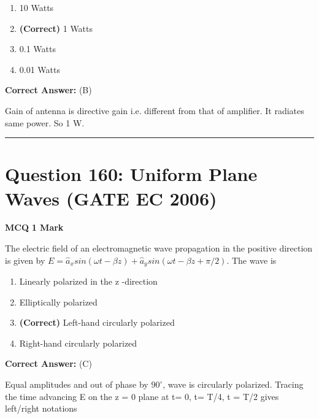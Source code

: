 \documentclass[11pt,a4paper]{article}
\begin{document}
\begin{enumerate}[label=(\Alph*)]
    \item 10 Watts
    \item \textbf{(Correct)} 1 Watts
    \item 0.1 Watts
    \item 0.01 Watts
\end{enumerate}

\noindent \textbf{Correct Answer:} (B)

\begin{tcolorbox}[solbox, title=Detailed Solution -- Question 159]
Gain of antenna is directive gain i.e. different from
that of amplifier. It radiates same power. So 1 W.
\end{tcolorbox}

\vspace{1.5em}
\hrule
\vspace{1.5em}

\section*{Question 160: Uniform Plane Waves (GATE EC 2006)}
\noindent \textbf{\color{primary}MCQ} \hfill \textbf{\color{secondary}1 Mark}


\noindent The electric field of an electromagnetic wave propagation in the positive
direction is given by 
 $E=\hat{a}_{x}sin(\omega t-\beta z)+\hat{a}_{y}sin(\omega t-\beta z+\pi /2)$. 
 The wave is


\begin{enumerate}[label=(\Alph*)]
    \item Linearly polarized in the z -direction
    \item Elliptically polarized
    \item \textbf{(Correct)} Left-hand circularly polarized
    \item Right-hand circularly polarized
\end{enumerate}

\noindent \textbf{Correct Answer:} (C)

\begin{tcolorbox}[solbox, title=Detailed Solution -- Question 160]
Equal amplitudes and out of phase by $90^{\circ}$, wave
is circularly polarized. Tracing the time advancing
E on the z = 0 plane at t= 0, t= T/4, t = T/2 gives
left/right notations
\end{tcolorbox}
\end{document}
